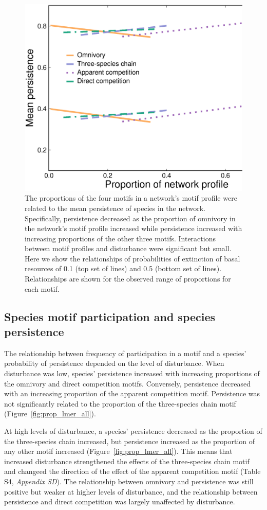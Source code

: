 \documentclass[12pt]{article}
\begin{document}
\begin{spacing}{2.0}
        \begin{figure}
            \centering
            \includegraphics[width=.5\textwidth]{figures/persistence_motif_profiles.eps}
            \caption{The proportions of the four motifs in a network's motif profile were related to the mean persistence of species in the network. Specifically, persistence decreased as the proportion of omnivory in the network's motif profile increased while persistence increased with increasing proportions of the other three motifs. Interactions between motif profiles and disturbance were significant but small. Here we show the relationships of probabilities of extinction of basal resources of 0.1 (top set of lines) and 0.5 (bottom set of lines). Relationships are shown for the observed range of proportions for each motif.}      
            \label{fig:motif_profile_persistence}
        \end{figure}    

    \subsection*{Species motif participation and species persistence} 
    
       The relationship between frequency of participation in a motif and a species' probability of persistence depended on the level of disturbance. 
       When disturbance was low, species' persistence increased with increasing proportions of the omnivory and direct competition motifs. 
       Conversely, persistence decreased with an increasing proportion of the apparent competition motif. 
       Persistence was not significantly related to the proportion of the three-species chain motif (Figure~\ref{fig:prop_lmer_all}).
            
            
        At high levels of disturbance, a species' persistence decreased as the proportion of the three-species chain increased, but persistence increased as the proportion of any other motif increased (Figure~\ref{fig:prop_lmer_all}). 
        This means that increased disturbance strengthened the effects of the three-species chain motif and changeed the direction of the effect of the apparent competition motif  (Table S4, \emph{Appendix SD}).
        The relationship between omnivory and persistence was still positive but weaker at higher levels of disturbance, and the relationship between persistence and direct competition was largely unaffected by disturbance.
    

\end{spacing}
\end{document}
